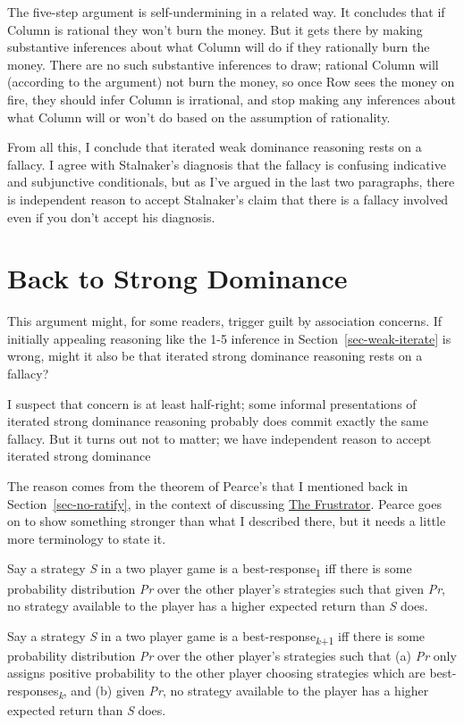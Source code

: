 \documentclass[
  12pt,
  letterpaper,
  DIV=11,
  numbers=noendperiod]{scrreprt}
\begin{document}
The five-step argument is self-undermining in a related way. It
concludes that if Column is rational they won't burn the money. But it
gets there by making substantive inferences about what Column will do if
they rationally burn the money. There are no such substantive inferences
to draw; rational Column will (according to the argument) not burn the
money, so once Row sees the money on fire, they should infer Column is
irrational, and stop making any inferences about what Column will or
won't do based on the assumption of rationality.

From all this, I conclude that iterated weak dominance reasoning rests
on a fallacy. I agree with Stalnaker's diagnosis that the fallacy is
confusing indicative and subjunctive conditionals, but as I've argued in
the last two paragraphs, there is independent reason to accept
Stalnaker's claim that there is a fallacy involved even if you don't
accept his diagnosis.

\section{Back to Strong Dominance}\label{sec-weak-strong}

This argument might, for some readers, trigger guilt by association
concerns. If initially appealing reasoning like the 1-5 inference in
Section~\ref{sec-weak-iterate} is wrong, might it also be that iterated
strong dominance reasoning rests on a fallacy?

I suspect that concern is at least half-right; some informal
presentations of iterated strong dominance reasoning probably does
commit exactly the same fallacy. But it turns out not to matter; we have
independent reason to accept iterated strong dominance

The reason comes from the theorem of Pearce's that I mentioned back in
Section~\ref{sec-no-ratify}, in the context of discussing
\hyperref[tbl-frustrator]{The Frustrator}. Pearce goes on to show
something stronger than what I described there, but it needs a little
more terminology to state it.

Say a strategy \emph{S} in a two player game is a
best-response\textsubscript{1} iff there is some probability
distribution \emph{Pr} over the other player's strategies such that
given \emph{Pr}, no strategy available to the player has a higher
expected return than \emph{S} does.

Say a strategy \emph{S} in a two player game is a
best-response\textsubscript{\emph{k}+1} iff there is some probability
distribution \emph{Pr} over the other player's strategies such that (a)
\emph{Pr} only assigns positive probability to the other player choosing
strategies which are best-responses\textsubscript{\emph{k}}, and (b)
given \emph{Pr}, no strategy available to the player has a higher
expected return than \emph{S} does.
\end{document}

